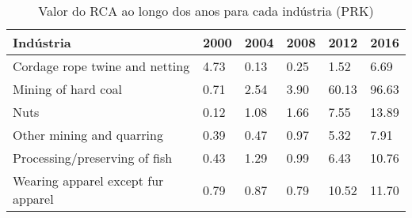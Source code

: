 \begin{table}
\centering
\caption{Valor do RCA ao longo dos anos para cada indústria (PRK)}
\label{tab:ex3-tempo-PRK}
\begin{tabular}{p{6cm}p{1.5cm}p{1.5cm}p{1.5cm}p{1.5cm}p{1.5cm}}
\toprule
                         Indústria & 2000 & 2004 & 2008 &  2012 &  2016 \\
\midrule
    Cordage rope twine and netting & 4.73 & 0.13 & 0.25 &  1.52 &  6.69 \\
               Mining of hard coal & 0.71 & 2.54 & 3.90 & 60.13 & 96.63 \\
                              Nuts & 0.12 & 1.08 & 1.66 &  7.55 & 13.89 \\
         Other mining and quarring & 0.39 & 0.47 & 0.97 &  5.32 &  7.91 \\
     Processing/preserving of fish & 0.43 & 1.29 & 0.99 &  6.43 & 10.76 \\
Wearing apparel except fur apparel & 0.79 & 0.87 & 0.79 & 10.52 & 11.70 \\
\bottomrule
\end{tabular}
\end{table}

